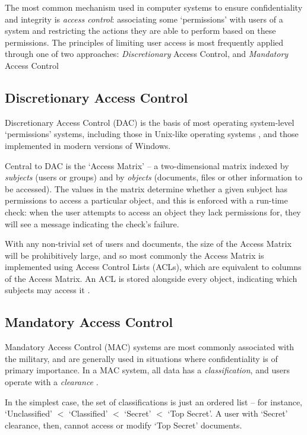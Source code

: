 The most common mechanism used in computer systems to ensure confidentiality and integrity is \textit{access control}: associating some `permissions' with users of a system and restricting the actions they are able to perform based on these permissions. The principles of limiting user access is most frequently applied through one of two approaches: \textit{Discretionary} Access Control, and \textit{Mandatory} Access Control

\subsection{Discretionary Access Control}

Discretionary Access Control (DAC) is the basis of most operating system-level `permissions' systems, including those in Unix-like operating systems \cite{sandhu1996role}, and those implemented in modern versions of Windows.

Central to DAC is the `Access Matrix' \cite{sandhu1994access} -- a two-dimensional matrix indexed by \textit{subjects} (users or groups) and by \textit{objects} (documents, files or other information to be accessed). The values in the matrix determine whether a given subject has permissions to access a particular object, and this is enforced with a run-time check: when the user attempts to access an object they lack permissions for, they will see a message indicating the check's failure.

With any non-trivial set of users and documents, the size of the Access Matrix will be prohibitively large, and so most commonly the Access Matrix is implemented using Access Control Lists (ACLs), which are equivalent to columns of the Access Matrix. An ACL is stored alongside every object, indicating which subjects may access it \cite{sandhu1994access}.

\subsection{Mandatory Access Control} \label{accesscontrol_mac}

Mandatory Access Control (MAC) systems are most commonly associated with the military, and are generally used in situations where confidentiality is of primary importance. In a MAC system, all data has a \textit{classification}, and users operate with a \textit{clearance} \cite{sandhu1994access}. 

In the simplest case, the set of classifications is just an ordered list -- for instance, `Unclassified' $ < $ `Classified' $ < $ `Secret' $ < $ `Top Secret'. A user with `Secret' clearance, then, cannot access or modify `Top Secret' documents.

